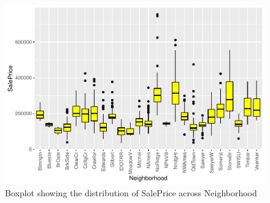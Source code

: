 \documentclass[aoas]{imsart}
\numberwithin{equation}{section}
\theoremstyle{plain}
\theoremstyle{remark}
\begin{document}
\begin{figure}
\centering
\includegraphics{STAT-444-FINAL-PROJECT-PROPOSAL_files/figure-latex/unnamed-chunk-7-1.pdf}
\caption{Boxplot showing the distribution of SalePrice across
Neighborhood\label{}}
\end{figure}



\end{document}
